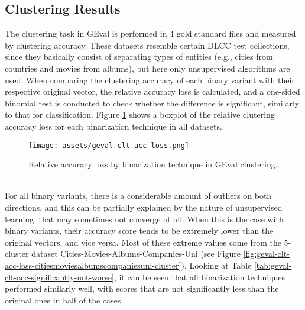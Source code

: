 \documentclass[11pt,titlepage,oneside,openany]{book}
\begin{document}
\subsection{Clustering Results}
\label{subsec:geval-clt}

The clustering task in GEval is performed in 4 gold standard files and measured by clustering accuracy. These datasets resemble certain DLCC test collections, since they basically consist of separating types of entities (e.g., cities from countries and movies from albums), but here only unsupervised algorithms are used. When comparing the clustering accuracy of each binary variant with their respective original vector, the relative accuracy loss is calculated, and a one-sided binomial test is conducted to check whether the difference is significant, similarly to that for classification. Figure \ref{fig:geval-clt-acc-loss} shows a boxplot of the relative clutering accuracy loss for each binarization technique in all datasets.\\
\begin{figure}[h!]
    \centering
    \centerline{\texttt{[image: assets/geval-clt-acc-loss.png]}}
    \vspace*{-3mm}
    \caption{Relative accuracy loss by binarization technique in GEval clustering.}
    \label{fig:geval-clt-acc-loss}
\end{figure}
\\
For all binary variants, there is a considerable amount of outliers on both directions, and this can be partially explained by the nature of unsupervised learning, that may sometimes not converge at all. When this is the case with binary variants, their accuracy score tends to be extremely lower than the original vectors, and vice versa. Most of these extreme values come from the 5-cluster dataset Cities-Movies-Albums-Companies-Uni (see Figure \ref{fig:geval-clt-acc-loss-citiesmoviesalbumscompaniesuni-cluster}). Looking at Table \ref{tab:geval-clt-acc-significantly-not-worse}, it can be seen that all binarization techniques performed similarly well, with scores that are not significantly less than the original ones in half of the cases.\\
\end{document}
